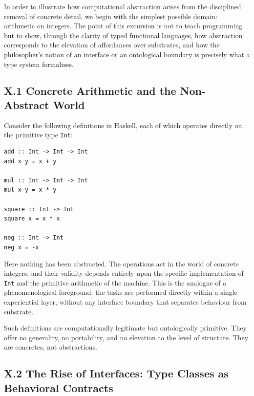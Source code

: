\documentclass[12pt,letterpaper]{article}
\theoremstyle{remark}
\begin{document}
In order to illustrate how computational abstraction arises from the disciplined removal of concrete detail, we begin with the simplest possible domain: arithmetic on integers. The point of this excursion is not to teach programming but to show, through the clarity of typed functional languages, how abstraction corresponds to the elevation of affordances over substrates, and how the philosopher’s notion of an interface or an ontological boundary is precisely what a type system formalizes.

\subsection{X.1 Concrete Arithmetic and the Non-Abstract World}

Consider the following definitions in Haskell, each of which operates directly on the primitive type \texttt{Int}:

\begin{verbatim}
add :: Int -> Int -> Int
add x y = x + y

mul :: Int -> Int -> Int
mul x y = x * y

square :: Int -> Int
square x = x * x

neg :: Int -> Int
neg x = -x
\end{verbatim}

Here nothing has been abstracted. The operations act in the world of concrete integers, and their validity depends entirely upon the specific implementation of \texttt{Int} and the primitive arithmetic of the machine. This is the analogue of a phenomenological foreground: the tasks are performed directly within a single experiential layer, without any interface boundary that separates behaviour from substrate.

Such definitions are computationally legitimate but ontologically primitive. They offer no generality, no portability, and no elevation to the level of structure. They are concretes, not abstractions.

\subsection{X.2 The Rise of Interfaces: Type Classes as Behavioral Contracts}
\end{document}
